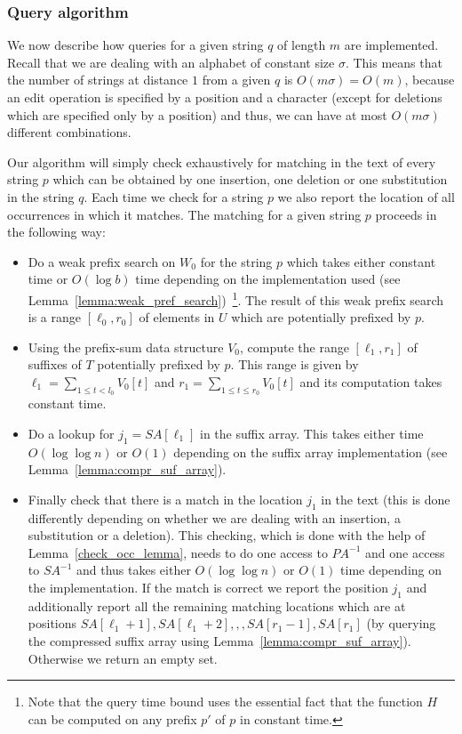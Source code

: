 \documentclass{article}
\newcommand{\?}{\mskip1.5mu}
\begin{document}
\subsubsection{Query algorithm}
\label{section:const_query_algo1}
We now describe how queries for a given string $q$ of length $m$ are implemented. Recall that we are dealing with an alphabet of constant size $\sigma$. This means that the number of strings at distance $1$ from a given $q$ is $O(m\sigma)=O(m)$, because an edit operation is specified by a position and a character (except for deletions which are specified only by a position) and thus, we can have at most $O(m\sigma)$ different combinations. 

Our algorithm will simply check exhaustively for matching in the text of every string $p$ which can be obtained by one insertion, one deletion or one substitution in the string $q$. 
Each time we check for a string $p$ we also report the location of all occurrences in which it matches. The matching for a given string $p$ proceeds in the following way:
\begin{itemize}
\item Do a weak prefix search on $W_0$ for the string $p$ which takes either constant time or $O(\log b)$ time depending on the implementation used (see Lemma~\ref{lemma:weak_pref_search})~\footnote{Note that the query time bound uses the essential fact that the function $H$ can be computed on any prefix $p'$ of $p$ in constant time.}. The result of this weak prefix search is a range $[\ell_0,r_0]$ of elements in $U$ which are potentially prefixed by $p$. 

\item Using the prefix-sum data structure $V_0$, compute the range $[\ell_1,r_1]$ of suffixes of $T$ potentially prefixed by $p$. This range is given by $\ell_1=\sum_{1\leq t<l_0}V_0[t]$ and $r_1=\sum_{1\leq t\leq r_0}V_0[t]$ and its computation takes constant time. 
\item Do a lookup for $j_1=SA[\ell_1]$ in the suffix array. This takes either time $O(\log\log n)$ or $O(1)$ depending on the suffix array implementation (see Lemma~\ref{lemma:compr_suf_array}). 
\item Finally check that there is a match in the location $j_1$ in the text (this is done differently depending on whether we are dealing with an insertion, a substitution or a deletion). This checking, which is done with the help of Lemma~\ref{check_occ_lemma}, needs to do one access to $PA^{-1}$ and one access to $SA^{-1}$ and thus takes either $O(\log\log n)$ or $O(1)$ time depending on the implementation. If the match is correct we report the position $j_1$ and additionally report all the remaining matching locations which are at positions $SA[\ell_1+1],SA[\ell_1+2],,,SA[r_1-1],SA[r_1]$ (by querying the compressed suffix array using Lemma~\ref{lemma:compr_suf_array}). Otherwise we return an empty set. 
\end{itemize}
\end{document}
